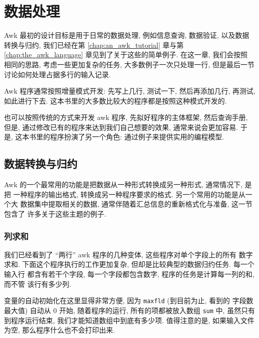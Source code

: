 \chapter{数据处理}
\label{chap:data_processing}

Awk 最初的设计目标是用于日常的数据处理, 例如信息查询, 数据验证, 以及数据
转换与归约, 我们已经在第 \ref{chap:an_awk_tutorial} 章与第
\ref{chap:the_awk_language} 章见到了关于这些的简单例子. 在这一章,
我们会按照
相同的思路, 考虑一些更加复杂的任务, 大多数例子一次只处理一行, 但是最后一节
讨论如何处理占据多行的输入记录.

Awk 程序通常按照增量模式开发: 先写上几行, 测试一下, 然后再添加几行, 再测试,
如此进行下去. 这本书里的大多数比较大的程序都是按照这种模式开发的.

也可以按照传统的方式来开发 awk 程序, 先拟好程序的主体框架, 然后查询手册,
但是, 通过修改已有的程序来达到我们自己想要的效果, 通常来说会更加容易.
于是, 这本书里的程序扮演了另一个角色: 通过例子来提供实用的编程模型.

\section{数据转换与归约}
\label{sec:data_transformation_and_reduction}

Awk 的一个最常用的功能是把数据从一种形式转换成另一种形式, 通常情况下, 是把
一种程序的输出格式, 转换成另一种程序要求的格式. 另一个常用的功能是从一个大
数据集中提取相关的数据, 通常伴随着汇总信息的重新格式化与准备, 这一节包含了
许多关于这些主题的例子.

\subsection{列求和}
\label{subsec:Summing_columns}

我们已经看到了 ``两行'' awk 程序的几种变体, 这些程序对单个字段上的所有
数字求和.
下面这个程序执行的工作更加复杂, 但却是比较典型的数据归约任务. 每一个输入行
都含有若干个字段, 每一个字段都包含数字, 程序的任务是计算每一列的和, 而不管
该行有多少列.
变量的自动初始化在这里显得非常方便, 因为 \verb'maxfld' (到目前为止, 看到的
字段数最大值) 自动从 0 开始, 随着程序的运行, 所有的项都被放入数组 \verb'sum'
中, 虽然只有到程序运行结束, 我们才能知道数组中到底有多少项. 值得注意的是,
如果输入文件为空, 那么程序什么也不会打印出来.


